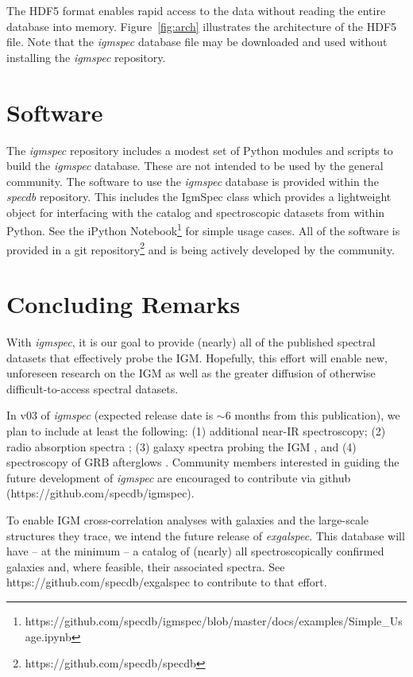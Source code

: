 \documentclass[12pt]{elsarticle}
\begin{document}
The HDF5 format enables rapid access to the data without
reading the entire database into memory.  
Figure~\ref{fig:arch} illustrates the 
architecture of the HDF5 file.
Note that the {\it igmspec} database file may be
downloaded and used without installing the {\it igmspec}
repository.


\section{Software}
\label{sec:software}

The {\it igmspec} repository includes 
a modest set of Python modules and scripts to build the
{\it igmspec} database.  
These are not intended to be used by the general community.
The software to use the {\it igmspec}
database is provided within the {\it specdb} repository.
This includes the
IgmSpec class which provides a lightweight object for
interfacing with the catalog and spectroscopic datasets
from within Python.  See the iPython Notebook\footnote{
https://github.com/specdb/igmspec/blob/master/docs/examples/Simple\_Usage.ipynb}
for simple usage cases.
All of the software is provided in a git repository\footnote{
https://github.com/specdb/specdb}
and is being actively developed by the community.

\section{Concluding Remarks}
\label{sec:end}

With {\it igmspec}, it is our goal to provide (nearly)
all of the published spectral datasets that effectively
probe the IGM.  Hopefully, this effort will
enable new, unforeseen research on the IGM as well
as the greater diffusion of otherwise difficult-to-access spectral
datasets.  

In v03 of
{\it igmspec} (expected release date is $\sim 6$ months from
this publication), we plan to include at least the following:
(1) additional near-IR spectroscopy;
(2) radio absorption spectra \citep[e.g. 21\,cm;][]{kanekar+14};
(3) galaxy spectra probing the IGM \citep[e.g.][]{rpk+10}, 
and
(4) spectroscopy of GRB afterglows \citep[e.g.][]{fjp+09}.
Community members interested in guiding the future development
of {\it igmspec} are encouraged to contribute via github
(https://github.com/specdb/igmspec).

To enable IGM cross-correlation analyses with galaxies
and the large-scale structures they trace,
we intend the future release of {\it exgalspec}.
This database will have -- at
the minimum -- a catalog of (nearly) all spectroscopically
confirmed galaxies and, where feasible, their associated
spectra.  See https://github.com/specdb/exgalspec
to contribute to that effort.
\end{document}
